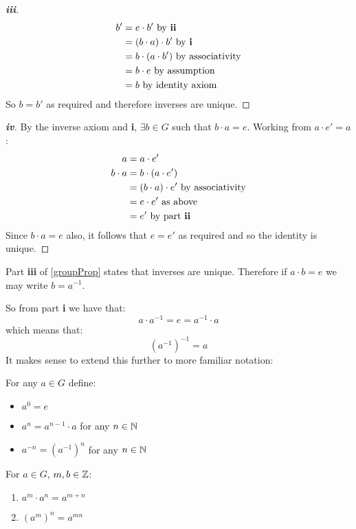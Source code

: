 \documentclass[../main.tex]{subfiles}
\begin{document}
\begin{proof}[\textbf{iii}]
  \begin{align*}
    b' &= e \cdot b' \text{ by \textbf{ii}} \\
       &= (b \cdot a) \cdot b' \text{ by \textbf{i}} \\
       &= b \cdot (a \cdot b') \text{ by associativity} \\
       &= b \cdot e \text{ by assumption} \\
       &= b \text{ by identity axiom}
  \end{align*} 
  So $b  = b'$ as required and therefore inverses are unique.
\end{proof}
\begin{proof}[\textbf{iv}]
  By the inverse axiom and \textbf{i}, $\exists b \in G$ such that $b \cdot a = e$.
  Working from $a \cdot e' = a$:
  \begin{align*}
    a &= a \cdot e'\\
    b \cdot a &= b \cdot (a \cdot e') \\
              &= (b \cdot a) \cdot e' \text{ by associativity} \\
              &= e \cdot e' \text{ as above} \\
              &= e' \text{ by part \textbf{ii}}
  \end{align*}
  Since $b \cdot a = e$ also, it follows that $e = e'$ as required and so the identity is unique.
\end{proof}
\begin{remark}[Notation]
  Part \textbf{iii} of \cref{groupProp} states that inverses are unique.
  Therefore if $a \cdot b = e$ we may write $b = a^{-1}$.
\end{remark}
So from part \textbf{i} we have that:
\[
  a \cdot a^{-1} = e = a^{-1} \cdot a
\]
which means that:
\[
  (a^{-1})^{-1} = a
\]
It makes sense to extend this further to more familiar notation:
\begin{remark}[Notation]
  For any $a \in G$ define:
  \begin{itemize}
    \item $a^{0} = e$
    \item $a^{n} = a^{n - 1} \cdot a$ for any $n \in \mathbb{N}$
    \item $a^{-n} = (a^{-1})^{n}$ for any $n \in \mathbb{N}$
  \end{itemize}
\end{remark}
\begin{proposition}
  For $a \in G$, $m, b \in \mathbb{Z}$:
  \begin{enumerate}
    \item $a^{m} \cdot a^{n} = a^{m + n}$
    \item $(a^{m})^{n} = a^{mn}$
  \end{enumerate}
\end{proposition}
\end{document}
